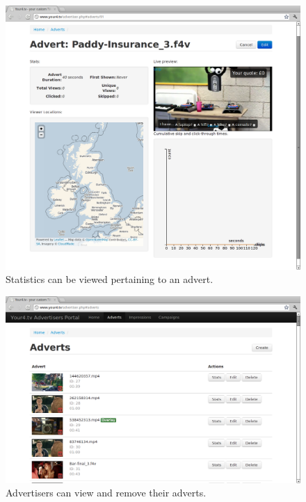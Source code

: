\begin{figure}[th]
	\centering
	\includegraphics[width=\textwidth,height=0.5\textheight,keepaspectratio]{images/screenshots/advertiser-advert.png}
	\caption{Statistics can be viewed pertaining to an advert.}
	\label{fig:advertiser-advert}
\end{figure}
\begin{figure}[th]
	\centering
	\includegraphics[width=\textwidth,height=0.5\textheight,keepaspectratio]{images/screenshots/advertiser-adverts.png}
	\caption{Advertisers can view and remove their adverts.}
	\label{fig:advertiser-adverts}
\end{figure}
